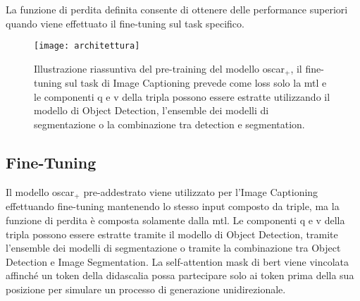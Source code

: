 La funzione di perdita definita consente di ottenere delle performance superiori quando viene effettuato il fine-tuning sul task specifico.

\begin{figure}[ht]
\centering
\texttt{[image: architettura]}
\caption{Illustrazione riassuntiva del pre-training del modello \acrshort{oscar}$_+$, il fine-tuning sul task di Image Captioning prevede come loss solo la \acrshort{mtl} e le componenti q e v della tripla possono essere estratte utilizzando il modello di Object Detection, l'ensemble dei modelli di segmentazione o la combinazione tra detection e segmentation.}
\end{figure}

\subsection{Fine-Tuning}

Il modello \acrshort{oscar}$_+$ pre-addestrato viene utilizzato per l'Image Captioning effettuando fine-tuning mantenendo lo stesso input composto da triple, ma la funzione di perdita è composta solamente dalla \acrlong{mtl}. Le componenti q e v della tripla possono essere estratte tramite il modello di Object Detection, tramite l'ensemble dei modelli di segmentazione o tramite la combinazione tra Object Detection e Image Segmentation. La self-attention mask di \acrshort{bert} viene vincolata affinché un token della didascalia possa partecipare solo ai token prima della sua posizione per simulare un processo di generazione unidirezionale.


